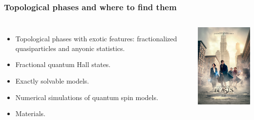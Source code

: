 \documentclass[xcolor=table, 10pt, aspectratio=169]{beamer}
\begin{document}
\begin{frame}
  \frametitle{Topological phases and where to find them}
  \begin{columns}
  \begin{itemize}
    \item<1-2> Topological phases with exotic features: fractionalized quasiparticles and anyonic statistics.
    \item<1-2> Fractional quantum Hall states.
    \item<1-2> Exactly solvable models.
    \item<1> Numerical simulations of quantum spin models.
    \item<1> Materials.
  \end{itemize}
  \begin{center}
    \includegraphics[width=4.5cm]{../resources/fbeasts}
  \end{center}
  \end{columns}
\end{frame}
\end{document}
